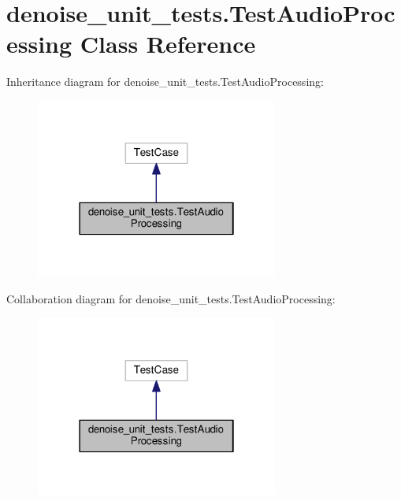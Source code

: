 \hypertarget{classdenoise__unit__tests_1_1TestAudioProcessing}{\section{denoise\-\_\-unit\-\_\-tests.\-Test\-Audio\-Processing Class Reference}
\label{classdenoise__unit__tests_1_1TestAudioProcessing}
}


Inheritance diagram for denoise\-\_\-unit\-\_\-tests.\-Test\-Audio\-Processing\-:
\nopagebreak
\begin{figure}[H]
\begin{center}
\leavevmode
\includegraphics[width=226pt]{classdenoise__unit__tests_1_1TestAudioProcessing__inherit__graph}
\end{center}
\end{figure}


Collaboration diagram for denoise\-\_\-unit\-\_\-tests.\-Test\-Audio\-Processing\-:
\nopagebreak
\begin{figure}[H]
\begin{center}
\leavevmode
\includegraphics[width=226pt]{classdenoise__unit__tests_1_1TestAudioProcessing__coll__graph}
\end{center}
\end{figure}

